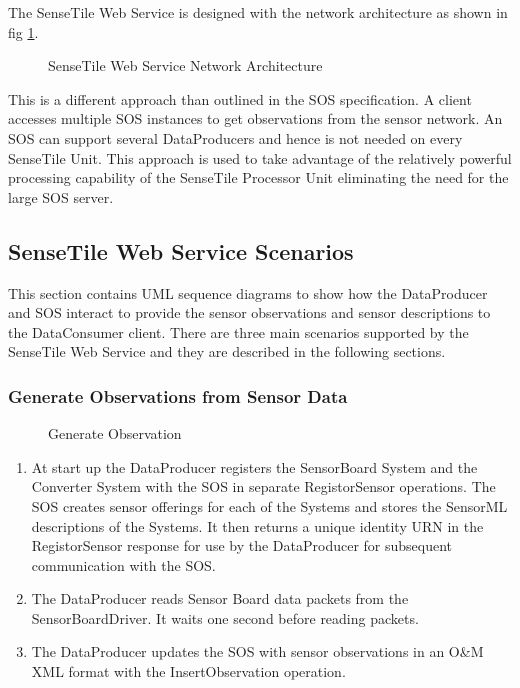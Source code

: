 \documentclass[]{final_report}
\begin{document}
The SenseTile Web Service is designed with the network architecture as shown in fig \ref{fig:Deployment_network}.
\begin{figure}[h]
\caption{SenseTile Web Service Network Architecture}\label{fig:Deployment_network}
\end{figure}
\newline
This is a different approach than outlined in the SOS specification. A client accesses multiple SOS instances to get observations from the sensor network. An SOS can support several DataProducers and hence is not needed on every SenseTile Unit. This approach is used to take advantage of the relatively powerful processing capability of the SenseTile Processor Unit eliminating the need for the large SOS server.

\subsection{SenseTile Web Service Scenarios}
This section contains UML sequence diagrams to show how the DataProducer and SOS interact to provide the sensor observations and sensor descriptions to the DataConsumer client. There are three main scenarios supported by the SenseTile Web Service and they are described in the following sections.

\subsubsection{Generate Observations from Sensor Data}
\begin{figure}[h]
\centering
{}
\caption{Generate Observation}\label{fig:InsertObs}
\end{figure}
\newpage
 \begin{enumerate}
\item At start up the DataProducer registers the SensorBoard System and the Converter System with the SOS in separate RegistorSensor operations. The SOS creates sensor offerings for each of the Systems and stores the SensorML descriptions of the Systems. It then returns a unique identity URN in the RegistorSensor response for use by the DataProducer for subsequent communication with the SOS.
\item The DataProducer reads Sensor Board data packets from the SensorBoardDriver. It waits one second before reading packets.
\item The DataProducer updates the SOS with sensor observations in an O\&M XML format with the InsertObservation operation.
\end{enumerate}
\end{document}
